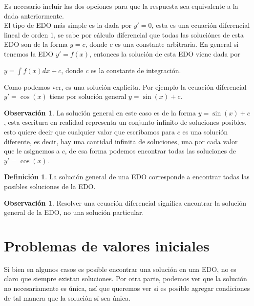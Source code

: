\documentclass{article}
\theoremstyle{plain}
\theoremstyle{definition}
\newtheorem{defin}[thm]{Definición}
\newtheorem{rmk}[thm]{Observación}
\begin{document}
Es necesario incluir las dos opciones para que la respuesta sea equivalente a la dada anteriormente. \\

El tipo de EDO más simple es  la dada por $y'=0$, esta es una ecuación diferencial lineal de orden 1, se sabe por cálculo diferencial que todas las soluciónes de esta EDO son de la forma $y=c$, donde $c$ es una constante arbitraria. En general si tenemos la EDO $y'= f(x)$, entonces la solución de esta EDO viene dada por

\begin{center}
$y= \displaystyle \int f(x)dx  +c$, donde $c$ es la constante de integración.
\end{center}

Como podemos ver, es una solución explícita. Por ejemplo la ecuación diferencial $y'= \cos(x)$ tiene por solución general $y= \sin(x) +c$. \\

\begin{rmk}La solución general en este caso es de la forma $y= \sin(x) +c$, esta escritura en realidad representa un conjunto infinito de soluciones posibles, esto quiere decir que cualquier valor que escribamos para $c$ es una solución diferente, es decir, hay una cantidad infinita de soluciones, una por cada valor que le asignemos a $c$, de esa forma podemos encontrar todas las soluciones de $y'=\cos(x)$. \\
\end{rmk}


\begin{defin}La solución general de una EDO corresponde a encontrar todas las posibles soluciones de la EDO. \\
\end{defin}

\begin{rmk}Resolver una ecuación diferencial significa encontrar la solución general de la EDO, no una solución particular.
\end{rmk}



\newpage


\section{Problemas de valores iniciales}




Si bien en algunos casos es posible encontrar una solución en una EDO, no es claro que siempre existan soluciones. Por otra parte, podemos ver que la solución no necesariamente es única, así que queremos ver si es posible agregar condiciones de tal manera que la solución sí sea única.\\
\end{document}

